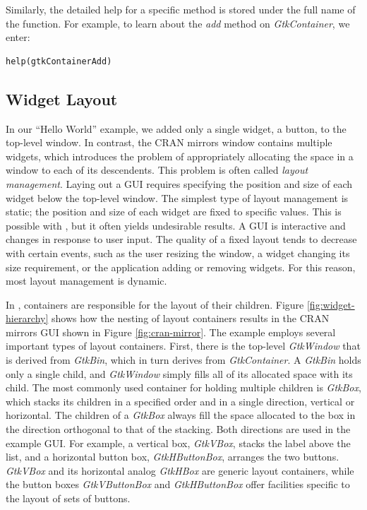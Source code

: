 \documentclass[article]{jss}
\begin{document}
Similarly, the detailed help for a specific method is stored under the full
name of the function. For example, to learn about the \emph{add} method on
\emph{GtkContainer}, we enter:
\begin{verbatim}
help(gtkContainerAdd)
\end{verbatim}

\subsection{Widget Layout}\label{sec:layout}

In our ``Hello World'' example, we added only a single widget, a button, to the 
top-level window. In contrast, the CRAN mirrors window contains multiple 
widgets, which introduces the problem of appropriately allocating the space in a
window to each of its descendents. This problem is often called \emph{layout management}.
Laying out a GUI requires specifying the position and size of each widget below
the top-level window. The simplest type of layout management is static; the
position and size of each widget are fixed to specific values. This is possible
with , but it often yields undesirable results. A GUI is interactive 
and changes in response to user input. The quality of a fixed layout tends to decrease
with certain events, such as the user resizing
the window, a widget changing its size requirement, or the application
adding or removing widgets. For this reason, most layout management is dynamic.

In , containers are responsible for the layout
of their children. Figure \ref{fig:widget-hierarchy} shows how the nesting of 
layout containers results in the CRAN mirrors GUI shown in Figure 
\ref{fig:cran-mirror}. The example employs several important types of 
layout containers. First, there is the top-level \emph{GtkWindow} that
is derived from \emph{GtkBin}, which in turn derives from \emph{GtkContainer}.
A \emph{GtkBin} holds only a single child, and \emph{GtkWindow} simply fills all
of its allocated space with its child. The most commonly used container
for holding multiple children is \emph{GtkBox}, which stacks its children
in a specified order and in a single direction, vertical or horizontal. The 
children of a \emph{GtkBox} always fill the space allocated to the box in 
the direction orthogonal to that of the stacking. Both
directions are used in the example GUI. For example, a vertical box, \emph{GtkVBox},
stacks the label above the list, and a horizontal button box, \emph{GtkHButtonBox},
arranges the two buttons. \emph{GtkVBox} and its horizontal analog \emph{GtkHBox}
are generic layout containers, while the button boxes \emph{GtkVButtonBox} and 
\emph{GtkHButtonBox} offer facilities specific to the layout of sets of buttons.
\end{document}
